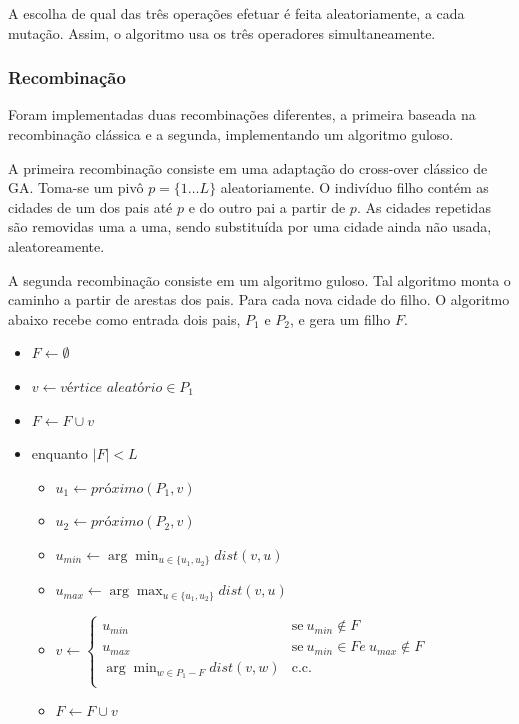\documentclass[a4paper]{article}
\begin{document}
A escolha de qual das três operações efetuar é feita aleatoriamente, a cada mutação. Assim, o algoritmo usa os três operadores simultaneamente.

\subsubsection{Recombinação}

Foram implementadas duas recombinações diferentes, a primeira baseada na recombinação clássica e a segunda, implementando um algoritmo guloso.

A primeira recombinação consiste em uma adaptação do cross-over clássico de GA. Toma-se um pivô $ p = \{1 \dots L\} $ aleatoriamente. O indivíduo filho contém as cidades de um dos pais até $ p $ e do outro pai a partir de $ p $. As cidades repetidas são removidas uma a uma, sendo substituída por uma cidade ainda não usada, aleatoreamente.

A segunda recombinação consiste em um algoritmo guloso. Tal algoritmo monta o caminho a partir de arestas dos pais. Para cada nova cidade do filho. O algoritmo abaixo recebe como entrada dois pais, $P_1$ e $P_2$, e gera um filho $F$.

\begin{itemize}
\item  $ F \leftarrow \emptyset $
\item  $ v \leftarrow \textit{vértice aleatório} \in P_1 $
\item  $ F \leftarrow F \cup v $
\item  enquanto $ |F| < L $
\begin{itemize}
    \item $ u_1 \leftarrow \textit{próximo}(P_1, v) $
    \item $ u_2 \leftarrow \textit{próximo}(P_2, v) $
    \item $ u_{min} \leftarrow \arg\min_{u \in \{u_1, u_2\} } \textit{dist}(v, u) $
    \item $ u_{max} \leftarrow \arg\max_{u \in \{u_1, u_2\} } \textit{dist}(v, u) $
    \item 
    $
    v \leftarrow 
    \left\{
    \begin{array}{ll}
      u_{min} & \textrm{se}~ u_{min} \notin F \\
      u_{max} & \textrm{se}~ u_{min} \in F \textit{e}~ u_{max} \notin F \\
      \arg\min_{w \in P_1 - F } \textit{dist}(v, w) & \textrm{c.c.} \\
    \end{array}
    \right.
    $
    \item  $ F \leftarrow F \cup v $
\end{itemize}
\end{itemize}
\end{document}
